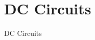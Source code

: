 \documentclass[../book.tex]{subfiles}
\begin{document}
\chapter{DC Circuits}
\label{ch:dc-circuits}

DC Circuits













\chapterbib
\end{document}
